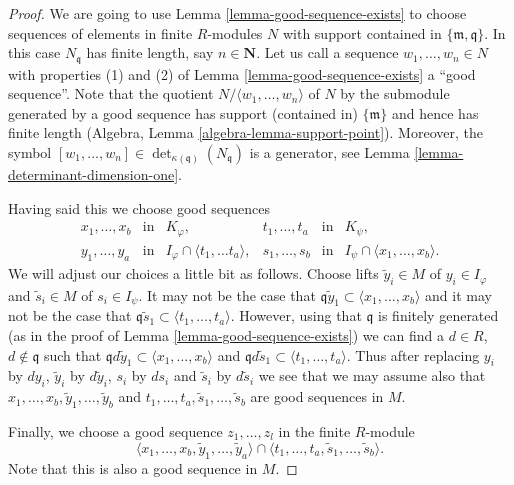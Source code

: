 \begin{proof}
\medskip\noindent
We are going to use Lemma \ref{lemma-good-sequence-exists}
to choose sequences of elements in finite $R$-modules
$N$ with support contained in $\{\mathfrak m, \mathfrak q\}$.
In this case $N_{\mathfrak q}$ has finite length, say $n \in \mathbf{N}$.
Let us call a sequence $w_1, \ldots, w_n \in N$
with properties (1) and (2) of Lemma \ref{lemma-good-sequence-exists}
a ``good sequence''. Note that the quotient
$N/\langle w_1, \ldots, w_n \rangle$ of $N$ by the submodule generated by
a good sequence has support (contained in) $\{\mathfrak m\}$
and hence has finite length (Algebra, Lemma \ref{algebra-lemma-support-point}).
Moreover, the symbol
$[w_1, \ldots, w_n] \in \det_{\kappa(\mathfrak q)}(N_{\mathfrak q})$
is a generator, see Lemma \ref{lemma-determinant-dimension-one}.

\medskip\noindent
Having said this we choose good sequences
$$
\begin{matrix}
x_1, \ldots, x_b & \text{in} & K_\varphi, &
t_1, \ldots, t_a & \text{in} & K_\psi, \\
y_1, \ldots, y_a & \text{in} & I_\varphi \cap \langle t_1, \ldots t_a\rangle,&
s_1, \ldots, s_b & \text{in} & I_\psi \cap \langle x_1, \ldots, x_b\rangle.
\end{matrix}
$$
We will adjust our choices a little bit as follows.
Choose lifts $\tilde y_i \in M$ of $y_i \in I_\varphi$
and $\tilde s_i \in M$ of $s_i \in I_\psi$. It may not be the case
that $\mathfrak q \tilde y_1 \subset \langle x_1, \ldots, x_b\rangle$
and it may not be the case that
$\mathfrak q \tilde s_1 \subset \langle t_1, \ldots, t_a\rangle$.
However, using that $\mathfrak q$ is finitely generated (as in the proof
of Lemma \ref{lemma-good-sequence-exists}) we can find a
$d \in R$, $d \not \in \mathfrak q$ such that
$\mathfrak q d\tilde y_1 \subset \langle x_1, \ldots, x_b\rangle$
and
$\mathfrak q d\tilde s_1 \subset \langle t_1, \ldots, t_a\rangle$.
Thus after replacing $y_i$ by $dy_i$,
$\tilde y_i$ by $d\tilde y_i$, $s_i$ by $ds_i$ and $\tilde s_i$
by $d\tilde s_i$ we see that we may assume also that
$x_1, \ldots, x_b, \tilde y_1, \ldots, \tilde y_b$
and $t_1, \ldots, t_a, \tilde s_1, \ldots, \tilde s_b$
are good sequences in $M$.

\medskip\noindent
Finally, we choose a good sequence
$z_1, \ldots, z_l$ in the finite $R$-module
$$
\langle
x_1, \ldots, x_b, \tilde y_1, \ldots, \tilde y_a
\rangle
\cap
\langle 
t_1, \ldots, t_a, \tilde s_1, \ldots, \tilde s_b
\rangle.
$$
Note that this is also a good sequence in $M$.


\end{proof}
